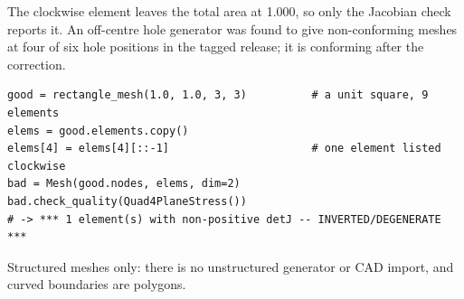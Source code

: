 \newpage\thispagestyle{hl}
\par
{}
\begin{hlheadline}The clockwise element leaves the total area at 1.000, so only the Jacobian check reports it. An off-centre hole generator was found to give non-conforming meshes at four of six hole positions in the tagged release; it is conforming after the correction.\end{hlheadline}
\begin{lstlisting}[style=hlpy]
good = rectangle_mesh(1.0, 1.0, 3, 3)          # a unit square, 9 elements
elems = good.elements.copy()
elems[4] = elems[4][::-1]                      # one element listed clockwise
bad = Mesh(good.nodes, elems, dim=2)
bad.check_quality(Quad4PlaneStress())
# -> *** 1 element(s) with non-positive detJ -- INVERTED/DEGENERATE ***
\end{lstlisting}
\begin{hllimit}Structured meshes only: there is no unstructured generator or CAD import, and curved boundaries are polygons.\end{hllimit}
